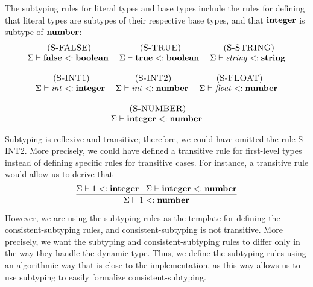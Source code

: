 The subtyping rules for literal types and base types include the rules
for defining that literal types are subtypes of their respective base types,
and that $\mathbf{integer}$ is subtype of $\mathbf{number}$:
\[
\begin{array}{c}
\begin{array}{c}
\; (\textsc{S-FALSE})\\
\Sigma \vdash \mathbf{false} <: \mathbf{boolean}
\end{array}
\;
\begin{array}{c}
\; (\textsc{S-TRUE})\\
\Sigma \vdash \mathbf{true} <: \mathbf{boolean}
\end{array}
\;
\begin{array}{c}
\; (\textsc{S-STRING})\\
\Sigma \vdash {\it string} <: \mathbf{string}
\end{array}
\\ \\
\begin{array}{c}
\; (\textsc{S-INT1})\\
\Sigma \vdash {\it int} <: \mathbf{integer}
\end{array}
\;
\begin{array}{c}
\; (\textsc{S-INT2})\\
\Sigma \vdash {\it int} <: \mathbf{number}
\end{array}
\;
\begin{array}{c}
\; (\textsc{S-FLOAT})\\
\Sigma \vdash {\it float} <: \mathbf{number}
\end{array}
\\ \\
\begin{array}{c}
\; (\textsc{S-NUMBER})\\
\Sigma \vdash \mathbf{integer} <: \mathbf{number}
\end{array}
\end{array}
\]

Subtyping is reflexive and transitive;
therefore, we could have omitted the rule \textsc{S-INT2}.
More precisely, we could have defined a transitive rule for first-level
types instead of defining specific rules for transitive cases.
For instance, a transitive rule would allow us to derive that
\[
\dfrac{\Sigma \vdash 1 <: \mathbf{integer} \;\;\;
       \Sigma \vdash \mathbf{integer} <: \mathbf{number}}
      {\Sigma \vdash 1 <: \mathbf{number}}
\]

However, we are using the subtyping rules as the template for defining
the consistent-subtyping rules, and consistent-subtyping is not
transitive.
More precisely, we want the subtyping and consistent-subtyping rules
to differ only in the way they handle the dynamic type.
Thus, we define the subtyping rules using an algorithmic
way that is close to the implementation, as this way allows us to use
subtyping to easily formalize consistent-subtyping.

